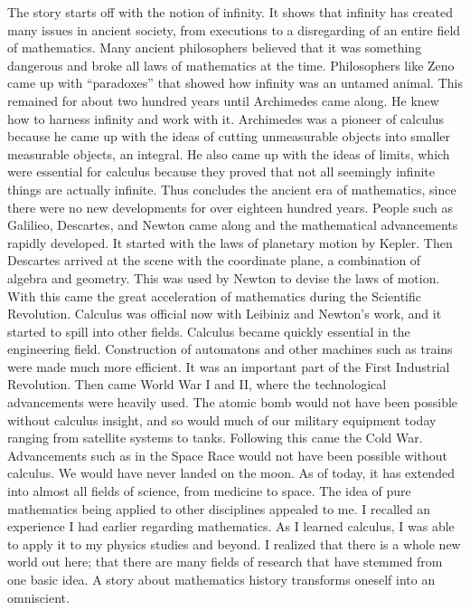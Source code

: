 \documentclass{article}
\begin{document}
The story starts off with the notion of infinity. It shows that infinity has created many issues in
ancient society, from executions to a disregarding of an entire field of mathematics. Many
ancient philosophers believed that it was something dangerous and broke all laws of
mathematics at the time. Philosophers like Zeno came up with “paradoxes” that showed how
infinity was an untamed animal. This remained for about two hundred years until Archimedes
came along. He knew how to harness infinity and work with it.
Archimedes was a pioneer of calculus because he came up with the ideas of cutting
unmeasurable objects into smaller measurable objects, an integral. He also came up with the
ideas of limits, which were essential for calculus because they proved that not all seemingly
infinite things are actually infinite. Thus concludes the ancient era of mathematics, since there
were no new developments for over eighteen hundred years.
People such as Galilieo, Descartes, and Newton came along and the mathematical
advancements rapidly developed. It started with the laws of planetary motion by Kepler. Then
Descartes arrived at the scene with the coordinate plane, a combination of algebra and
geometry. This was used by Newton to devise the laws of motion. With this came the great
acceleration of mathematics during the Scientific Revolution. Calculus was official now with
Leibiniz and Newton’s work, and it started to spill into other fields.
Calculus became quickly essential in the engineering field. Construction of automatons and
other machines such as trains were made much more efficient. It was an important part of the
First Industrial Revolution. Then came World War I and II, where the technological
advancements were heavily used. The atomic bomb would not have been possible without
calculus insight, and so would much of our military equipment today ranging from satellite
systems to tanks. Following this came the Cold War. Advancements such as in the Space Race
would not have been possible without calculus. We would have never landed on the moon. As
of today, it has extended into almost all fields of science, from medicine to space.
The idea of pure mathematics being applied to other disciplines appealed to me. I recalled an
experience I had earlier regarding mathematics. As I learned calculus, I was able to apply it to
my physics studies and beyond. I realized that there is a whole new world out here; that there
are many fields of research that have stemmed from one basic idea. A story about mathematics
history transforms oneself into an omniscient.
\end{document}
